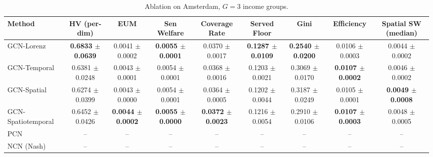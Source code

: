 \begin{table}[htbp]
\centering
\caption{Ablation on Amsterdam, $G=3$ income groups.}
\label{tab:ablation_amsterdam_g3}
\begin{tabular}{lcccccccc}
\toprule
Method & HV (per-dim) & EUM & Sen Welfare & Coverage Rate & Served Floor & Gini & Efficiency & Spatial SW (median) \\
\midrule
GCN-Lorenz & \textbf{0.6833 $\pm$ 0.0639} & 0.0041 $\pm$ 0.0002 & \textbf{0.0055 $\pm$ 0.0001} & 0.0370 $\pm$ 0.0017 & \textbf{0.1287 $\pm$ 0.0109} & \textbf{0.2540 $\pm$ 0.0200} & 0.0106 $\pm$ 0.0003 & 0.0044 $\pm$ 0.0002 \\
GCN-Temporal & 0.6381 $\pm$ 0.0248 & 0.0043 $\pm$ 0.0001 & 0.0054 $\pm$ 0.0001 & 0.0368 $\pm$ 0.0016 & 0.1203 $\pm$ 0.0021 & 0.3069 $\pm$ 0.0170 & \textbf{0.0107 $\pm$ 0.0002} & 0.0046 $\pm$ 0.0002 \\
GCN-Spatial & 0.6274 $\pm$ 0.0399 & 0.0043 $\pm$ 0.0000 & 0.0054 $\pm$ 0.0001 & 0.0364 $\pm$ 0.0005 & 0.1202 $\pm$ 0.0044 & 0.3187 $\pm$ 0.0249 & 0.0105 $\pm$ 0.0001 & \textbf{0.0049 $\pm$ 0.0008} \\
GCN-Spatiotemporal & 0.6452 $\pm$ 0.0426 & \textbf{0.0044 $\pm$ 0.0002} & \textbf{0.0055 $\pm$ 0.0000} & \textbf{0.0372 $\pm$ 0.0023} & 0.1216 $\pm$ 0.0054 & 0.2910 $\pm$ 0.0106 & \textbf{0.0107 $\pm$ 0.0003} & 0.0048 $\pm$ 0.0005 \\
PCN & -- & -- & -- & -- & -- & -- & -- & -- \\
NCN (Nash) & -- & -- & -- & -- & -- & -- & -- & -- \\
\bottomrule
\end{tabular}
\end{table}


